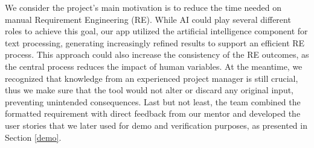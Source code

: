 We consider the project's main motivation is to reduce the time needed on manual Requirement Engineering (RE). While AI could play several different roles to achieve this goal, our app utilized the artificial intelligence component for text processing, generating increasingly refined results to support an efficient RE process. This approach could also increase the consistency of the RE outcomes, as the central process reduces the impact of human variables. At the meantime, we recognized that knowledge from an experienced project manager is still crucial, thus we make sure that the tool would not alter or discard any original input, preventing unintended consequences. Last but not least, the team combined the formatted requirement with direct feedback from our mentor and developed the user stories that we later used for demo and verification purposes, as presented in Section \ref{demo}.